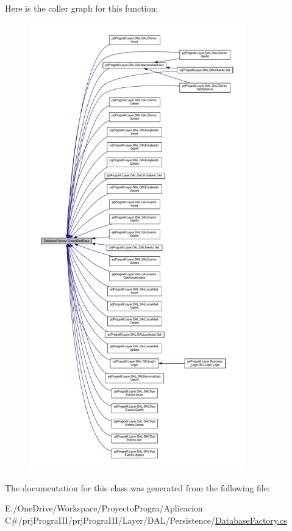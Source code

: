 Here is the caller graph for this function\+:
\nopagebreak
\begin{figure}[H]
\begin{center}
\leavevmode
\includegraphics[height=550pt]{class_database_factory_af9abd1d335ada61ef9fe450a97d4a9b5_icgraph}
\end{center}
\end{figure}


The documentation for this class was generated from the following file\+:\begin{DoxyCompactItemize}
\item 
E\+:/\+One\+Drive/\+Workspace/\+Proyecto\+Progra/\+Aplicacion C\#/prj\+Progra\+I\+I\+I/prj\+Progra\+I\+I\+I/\+Layer/\+D\+A\+L/\+Persistence/\hyperlink{_database_factory_8cs}{Database\+Factory.\+cs}\end{DoxyCompactItemize}

